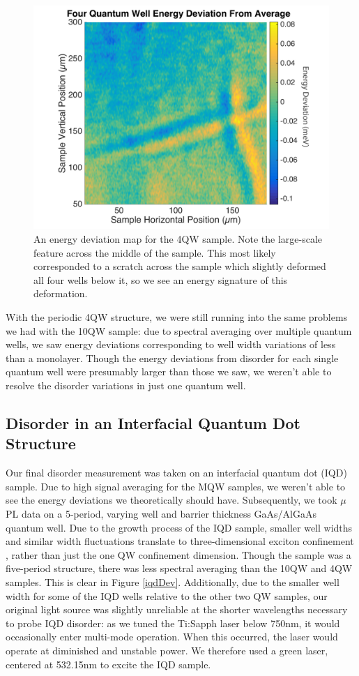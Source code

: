 \begin{figure}[h!]
\centering
\includegraphics[width = .7\textwidth]{4QW_devplot.png}
\caption{ \doublespacing An energy deviation map for the 4QW sample. Note the large-scale feature across the middle of the sample. This most likely corresponded to a scratch across the sample which slightly deformed all four wells below it, so we see an energy signature of this deformation.}
\label{4qwdev}
\end{figure}
\newpage

\indent With the periodic 4QW structure, we were still running into the same problems we had with the 10QW sample: due to spectral averaging over multiple quantum wells, we saw energy deviations corresponding to well width variations of less than a monolayer. Though the energy deviations from disorder for each single quantum well were presumably larger than those we saw, we weren't able to resolve the disorder variations in just one quantum well. 

\subsection{Disorder in an Interfacial Quantum Dot Structure}
\indent Our final disorder measurement was taken on an interfacial quantum dot (IQD) sample. Due to high signal averaging for the MQW samples, we weren't able to see the energy deviations we theoretically should have. Subsequently, we took $\mu$PL data on a 5-period, varying well and barrier thickness GaAs/AlGaAs quantum well. Due to the growth process of the IQD sample, smaller well widths and similar width fluctuations translate to three-dimensional exciton confinement \cite{galanthesis, fox}, rather than just the one QW confinement dimension. Though the sample was a five-period structure, there was less spectral averaging than the 10QW and 4QW samples. This is clear in Figure \ref{iqdDev}. Additionally, due to the smaller well width for some of the IQD wells relative to the other two QW samples, our original light source was slightly unreliable at the shorter wavelengths necessary to probe IQD disorder: as we tuned the Ti:Sapph laser below 750nm, it would occasionally enter multi-mode operation. When this occurred, the laser would operate at diminished and unstable power. We therefore used a green laser, centered at 532.15nm to excite the IQD sample.


